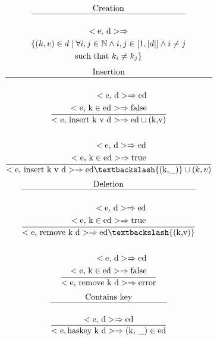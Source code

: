 \documentclass[a4paper, 11pt]{article}
\newcommand{\te}[1]{\text{#1}}
\def\N{\mathbb{N}}
\DeclarePairedDelimiter\abs{\lvert}{\rvert}
\theoremstyle{plain}%
\theoremstyle{definition}
\theoremstyle{remark}
\begin{document}
\begin{multicols}{2}
\begin{gather*}
	\te{Creation} \\
	\hline \\
	<\te{e, d}> \Rightarrow \\ \{ (k,v) \in d \mid \forall i,j \in \N \wedge i,j \in \left[1, \abs{d}\right] \land i \neq j \\ \text{such that } k_i \neq k_j \}
\end{gather*}
\begin{gather*}
	\te{Insertion} \\
	\hline \\
	\dfrac{ \begin{aligned}
		<\te{e, d}> \Rightarrow \te{ed} \\
		<\te{e, k} \in \te{ed}> \Rightarrow \te{false} \\
	\end{aligned} }{<\te{e, insert k v d}> \Rightarrow \te{ed} \cup (\te{k,v})} \\ \\
	\dfrac{ \begin{aligned}
		<\te{e, d}> \Rightarrow \te{ed} \\
		<\te{e, k} \in \te{ed}> \Rightarrow \te{true}
	\end{aligned}}{<\te{e, insert k v d}> \Rightarrow \te{ed} \textbackslash \{(\te{k,\_})\} \cup (k, v) }
\end{gather*}
\begin{gather*}
	\te{Deletion} \\ \hline \\
	\dfrac{	\begin{aligned}
		<\te{e, d}> \Rightarrow \te{ed} \\
		<\te{e, k} \in \te{ed}> \Rightarrow \te{true}
	\end{aligned}}{<\te{e, remove k d}> \Rightarrow \te{ed} \textbackslash \{(\te{k,v})\}} \\ \\
	\dfrac{	\begin{aligned}
		<\te{e, d}> \Rightarrow \te{ed} \\
		<\te{e, k} \in \te{ed}> \Rightarrow \te{false}
	\end{aligned}}{<\te{e, remove k d}> \Rightarrow \te{error}}
\end{gather*}
\begin{gather*}
	\te{Contains key} \\ \hline \\
	\dfrac{<\te{e, d}> \Rightarrow \te{ed}}{<\te{e}, \te{haskey k d}> \Rightarrow (\te{k, \_}) \in \te{ed}}

\end{gather*}
\end{multicols}
\end{document}
